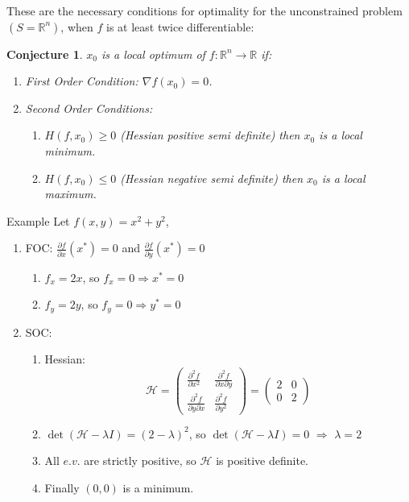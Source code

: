 \documentclass[aspectratio=169]{beamer}
\newtheorem{proposition}{Conjecture}[section]
\begin{document}
\begin{frame}
    
    These are the necessary conditions for optimality for the unconstrained problem $(S=\mathds{R}^n)$, when $f$ is at least twice differentiable:
    
    \begin{proposition}
    $x_0$ is a local optimum of $f:\mathds{R}^n\rightarrow\mathds{R}$ if:
    \begin{enumerate}
        \item First Order Condition:  $\nabla f(x_0)=0$.
        \item Second Order Conditions:
        \begin{enumerate}
            \item $H(f,x_0)\geq 0$ (Hessian positive semi definite) then $x_0$ is a local minimum.
        \item $H(f,x_0)\leq 0$ (Hessian negative semi definite) then $x_0$ is a local maximum.  
        \end{enumerate}
    \end{enumerate}
    \end{proposition}
    
\end{frame}

\begin{frame}{Example}
    Let $f(x,y)=x^2+y^2$,
    
    \begin{enumerate}
        \item FOC: $\frac{\partial f}{\partial x}(x^*)=0$ and $\frac{\partial f}{\partial y}(x^*)=0$
        \begin{enumerate}
            \item $f_{x}=2x$, so $f_{x}=0 \Rightarrow x^*=0$
            \item $f_{y}=2y$, so $f_{y}=0 \Rightarrow y^*=0$
        \end{enumerate}
        \item SOC:
        \begin{enumerate}
            \item Hessian: $$\mathcal{H}=\begin{pmatrix}\frac{\partial^2 f}{\partial x^2} & \frac{\partial^2 f}{\partial x\partial y} \\ \frac{\partial^2 f}{\partial y\partial x} & \frac{\partial^2 f}{\partial y^2}\end{pmatrix}=\begin{pmatrix}2&0\\0&2\end{pmatrix}$$
            \item $\det(\mathcal{H}-\lambda I) = (2-\lambda)^2$, so $\det(\mathcal{H}-\lambda I)=0$ $\Rightarrow$ $\lambda=2$
            \item All $e.v.$ are strictly positive, so $\mathcal{H}$ is positive definite.
            \item Finally $(0,0)$ is a minimum.
        \end{enumerate}
    \end{enumerate}
    
\end{frame}
\end{document}
